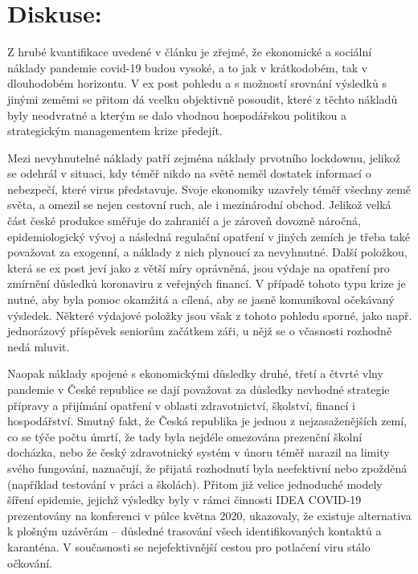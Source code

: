 \section*{Diskuse:} 
Z hrubé kvantifikace uvedené v článku je zřejmé, že ekonomické a sociální náklady pandemie covid-19 budou vysoké, a to jak v krátkodobém, tak v dlouhodobém horizontu. V ex post pohledu a s možností srovnání výsledků s jinými zeměmi se přitom dá vcelku objektivně posoudit, které z těchto nákladů byly neodvratné a kterým se dalo vhodnou hospodářskou politikou a strategickým managementem krize předejít.

Mezi nevyhnutelné náklady patří zejména náklady prvotního lockdownu, jelikož se odehrál v situaci, kdy téměř nikdo na světě neměl dostatek informací o nebezpečí, které virus představuje. Svoje ekonomiky uzavřely téměř všechny země světa, a omezil se nejen cestovní ruch, ale i mezinárodní obchod. Jelikož velká část české produkce směřuje do zahraničí a je zároveň dovozně náročná, epidemiologický vývoj a následná regulační opatření v jiných zemích je třeba také považovat za exogenní, a náklady z nich plynoucí za nevyhnutné. Další položkou, která se ex post jeví jako z větší míry oprávněná, jsou výdaje na opatření pro zmírnění důsledků koronaviru z veřejných financí. V případě tohoto typu krize je nutné, aby byla pomoc okamžitá a cílená, aby se jasně komunikoval očekávaný výsledek. Některé výdajové položky jsou však z tohoto pohledu sporné, jako např. jednorázový příspěvek seniorům začátkem záři, u nějž se o včasnosti rozhodně nedá mluvit.

Naopak náklady spojené s ekonomickými důsledky druhé, třetí a čtvrté vlny pandemie v České republice se dají považovat za důsledky nevhodné strategie přípravy a přijímání opatření v oblasti zdravotnictví, školství, financí i hospodářství. Smutný fakt, že Česká republika je jednou z nejzasaženějších zemí, co se týče počtu úmrtí, že tady byla nejdéle omezována prezenční školní docházka, nebo že český zdravotnický systém v únoru téměř narazil na limity svého fungování, naznačují, že přijatá rozhodnutí byla neefektivní nebo zpožděná (například testování v práci a školách). Přitom již velice jednoduché modely šíření epidemie, jejichž výsledky byly v rámci činnosti IDEA COVID-19 prezentovány na konferenci v půlce května 2020, ukazovaly, že existuje alternativa k plošným uzávěrám – důsledné trasování všech identifikovaných kontaktů a karanténa. V současnosti se nejefektivnější cestou pro potlačení viru stálo očkování. 
